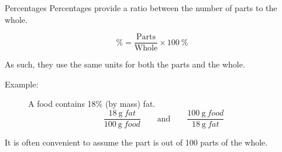 \documentclass[notes=show]{beamer}
\begin{document}
\begin{frame}{Percentages}
	Percentages provide a \alert{ratio} between the number of parts to the
	whole.

	\begin{equation*}
		\si{\percent} = \frac{\text{Parts}}{\text{Whole}} \times \SI{100}{\percent}
	\end{equation*}

	As such, they use the same units for both the parts and the whole.
	\begin{description}
		\item[Example:] A food contains 18\% (by mass) fat.
			\begin{equation*}
				\frac{\SI{18}{\gram~fat}}{\SI{100}{\gram~food}}
				\qquad\text{and}\qquad
				\frac{\SI{100}{\gram~food}}{\SI{18}{\gram~fat}}
			\end{equation*}
	\end{description}

	It is often \alert{convenient} to assume the part is out of 100 parts of
	the whole.
\end{frame}
\end{document}

